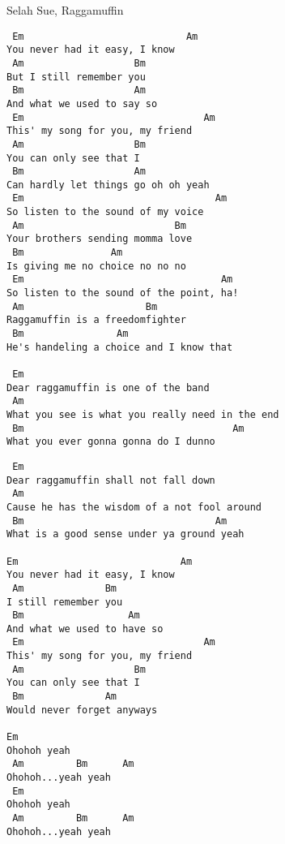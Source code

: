 \documentclass[12pt]{article}
\begin{document}
Selah Sue, Raggamuffin

\begin{multicols}{2}

\begin{verbatim}
 Em                            Am
You never had it easy, I know
 Am                   Bm
But I still remember you
 Bm                   Am
And what we used to say so
 Em                               Am
This' my song for you, my friend
 Am                   Bm
You can only see that I
 Bm                   Am
Can hardly let things go oh oh yeah
 Em                                 Am
So listen to the sound of my voice
 Am                          Bm
Your brothers sending momma love
 Bm               Am
Is giving me no choice no no no
 Em                                  Am
So listen to the sound of the point, ha!
 Am                     Bm
Raggamuffin is a freedomfighter
 Bm                Am
He's handeling a choice and I know that

 Em
Dear raggamuffin is one of the band
 Am
What you see is what you really need in the end
 Bm                                    Am
What you ever gonna gonna do I dunno
\end{verbatim}

\columnbreak
\begin{verbatim}
 Em
Dear raggamuffin shall not fall down
 Am
Cause he has the wisdom of a not fool around
 Bm                                 Am
What is a good sense under ya ground yeah

Em                            Am
You never had it easy, I know
 Am              Bm
I still remember you
 Bm                  Am
And what we used to have so
 Em                               Am
This' my song for you, my friend
 Am                   Bm
You can only see that I
 Bm              Am
Would never forget anyways

Em
Ohohoh yeah
 Am         Bm      Am
Ohohoh...yeah yeah
 Em
Ohohoh yeah
 Am         Bm      Am
Ohohoh...yeah yeah
\end{verbatim}

\end{multicols}
\end{document}
